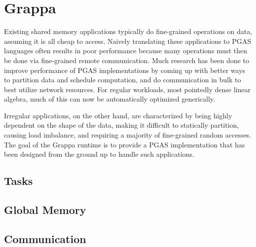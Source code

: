 \section{Grappa}
Existing shared memory applications typically do fine-grained operations on data, assuming it is all cheap to access.
Naively translating these applications to PGAS languages often results in poor performance because many operations must then be done via fine-grained remote communication.
Much research has been done to improve performance of PGAS implementations by coming up with better ways to partition data and schedule computation, and do communication in bulk to best utilize network resources.
For regular workloads, most pointedly dense linear algebra, much of this can now be automatically optimized generically.

Irregular applications, on the other hand, are characterized by being highly dependent on the shape of the data, making it difficult to statically partition, causing load imbalance, and requiring a majority of fine-grained random accesses. The goal of the Grappa runtime is to provide a PGAS implementation that has been designed from the ground up to handle such applications.

\subsection{Tasks}

\subsection{Global Memory}

\subsection{Communication}
